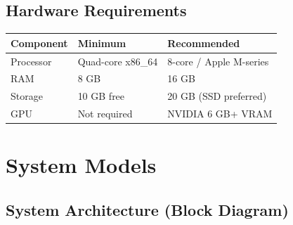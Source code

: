 \documentclass[12pt,a4paper]{article}
\begin{document}
\subsection{Hardware Requirements}

\begin{center}
\begin{tabularx}{\textwidth}{|l|X|X|}
    \hline
    \textbf{Component} & \textbf{Minimum} & \textbf{Recommended} \\ \hline
    Processor & Quad-core x86\_64 & 8-core / Apple M-series \\ \hline
    RAM & 8 GB & 16 GB \\ \hline
    Storage & 10 GB free & 20 GB (SSD preferred) \\ \hline
    GPU & Not required & NVIDIA 6 GB+ VRAM \\ \hline
\end{tabularx}
\end{center}



\section{System Models}

\subsection{System Architecture (Block Diagram)}
\end{document}
